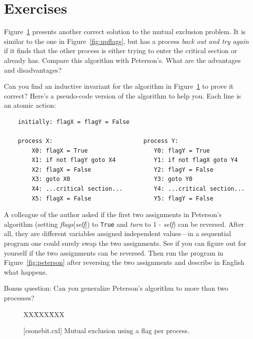 \documentclass{report}
\newcommand{\cxlsource}[1]{
\begin{tabbing}
XX\=XXX\=XXX\kill
    
\end{tabbing}
}
\newenvironment{code}{
\tcolorbox
}{
\endtcolorbox
}
\begin{document}
\section*{Exercises}
\begin{problems}
\item Figure~\ref{fig:csonebit} presents another correct solution to the
mutual exclusion problem.  It is similar to the one in
Figure~\ref{fig:upflags}, but has a process \emph{back out and try again}
if it finds that the other process is either trying to enter the critical
section or already has.  Compare this algorithm with Peterson's.  What are
the advantages and disadvantages?
\item
Can you find an inductive invariant for the algorithm in
Figure~\ref{fig:csonebit} to prove it correct?
Here's a pseudo-code version of the algorithm to help you.  Each line
is an atomic action:
\begin{code}
\begin{verbatim}
    initially: flagX = flagY = False

    process X:                          process Y:
        X0: flagX = True                   Y0: flagY = True
        X1: if not flagY goto X4           Y1: if not flagX goto Y4
        X2: flagX = False                  Y2: flagY = False
        X3: goto X0                        Y3: goto Y0
        X4: ...critical section...         Y4: ...critical section...
        X5: flagX = False                  Y5: flagY = False
\end{verbatim}
\end{code}
\item A colleague of the author asked if the first two assignments in
Peterson's algorithm (setting \textit{flags}[\textit{self}])
to \texttt{True} and \textit{turn} to 1 - \textit{self}) can be reversed.
After all, they are different variables assigned independent values---in a
sequential program one could surely swap the two assignments.
See if you can figure out for yourself if the two assignments can be
reversed.  Then run the program in Figure~\ref{fig:peterson} after reversing
the two assignments and describe in English what happens.
\item Bonus question:
Can you generalize Peterson's algorithm to more than two processes?
\end{problems}

\begin{figure}
\begin{code}
\cxlsource{csonebit}
\end{code}
\caption{[csonebit.cxl] Mutual exclusion using a flag per process.}
\label{fig:csonebit}
\end{figure}
\end{document}
